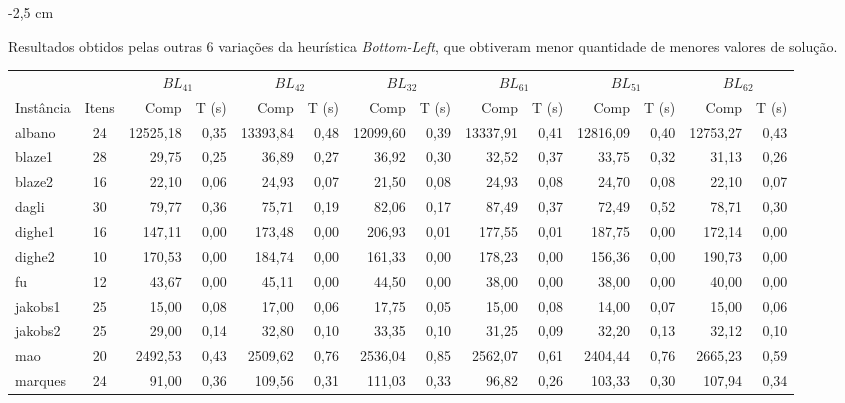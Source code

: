 \documentclass{article}
\newcommand{\lgray}{\cellcolor{lightgray}}
\begin{document}
\begin{adjustwidth}{-2 cm}{-2,5 cm}\centering\begin{threeparttable}[!htb]
\renewcommand{\arraystretch}{1.2}%
    \caption{Resultados obtidos pelas outras 6 variações da heurística {\it Bottom-Left}, que obtiveram menor quantidade de menores valores de solução.}
    \scriptsize{
        \begin{tabular}{|l|c|rr|rr|rr|rr|rr|rr|}\hline
        \multicolumn{1}{|c|}{} & \multicolumn{1}{c|}{} &  \multicolumn{2}{c|}{$BL_{41}$} & \multicolumn{2}{c|}{$BL_{42}$} & \multicolumn{2}{c|}{$BL_{32}$} &
        \multicolumn{2}{c|}{$BL_{61}$} &
        \multicolumn{2}{c|}{$BL_{51}$} &
        \multicolumn{2}{c|}{$BL_{62}$}\\
            Instância &Itens &Comp &T (s) &Comp &T (s) &Comp &T (s) &Comp &T (s) &Comp &T (s) &Comp &T (s) \\\hline
            albano &24  &12525,18 &0,35  &13393,84 &0,48  &12099,60 &0,39  &13337,91 &0,41  &12816,09 &0,40  &12753,27 &0,43 \\
            blaze1 &28  &29,75 &0,25  &36,89 &0,27  &36,92 &0,30  &32,52 &0,37  &33,75 &0,32  &31,13 &0,26 \\
            blaze2 &16  &22,10 &0,06  &24,93 &0,07  &\lgray21,50 &0,08  &24,93 &0,08  &24,70 &0,08  &22,10 &0,07 \\
            dagli &30  &79,77 &0,36  &75,71 &0,19  &82,06 &0,17  &87,49 &0,37  &72,49 &0,52  &78,71 &0,30 \\
            dighe1 &16  &147,11 &0,00  &173,48 &0,00  &206,93 &0,01  &177,55 &0,01  &187,75 &0,00  &172,14 &0,00 \\
            dighe2 &10  &170,53 &0,00  &184,74 &0,00  &161,33 &0,00  &178,23 &0,00  &156,36 &0,00  &190,73 &0,00 \\
            fu &12  &43,67 &0,00  &45,11 &0,00  &44,50 &0,00  &38,00 &0,00  &38,00 &0,00  &40,00 &0,00 \\
            jakobs1 &25  &15,00 &0,08  &17,00 &0,06  &17,75 &0,05  &15,00 &0,08  &14,00 &0,07  &15,00 &0,06 \\
            jakobs2 &25  &\lgray29,00 &0,14  &32,80 &0,10  &33,35 &0,10  &31,25 &0,09  &32,20 &0,13  &32,12 &0,10 \\
            mao &20  &2492,53 &0,43  &2509,62 &0,76  &2536,04 &0,85  &2562,07 &0,61  &2404,44 &0,76  &2665,23 &0,59 \\
            marques &24  &91,00 &0,36  &109,56 &0,31  &111,03 &0,33  &96,82 &0,26  &103,33 &0,30  &107,94 &0,34 \\

\end{tabular}}
\end{threeparttable}
\end{adjustwidth}
\end{document}
